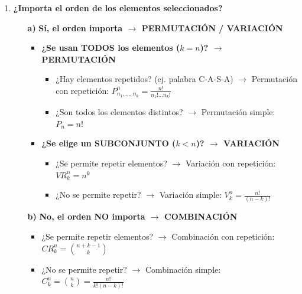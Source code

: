 \documentclass[12pt, letterpaper]{article}
\begin{document}
\begin{enumerate}[label=\bfseries Paso \arabic*:, wide]
    \item \textbf{¿Importa el orden de los elementos seleccionados?}
    \begin{itemize}
        \item[\bfseries a)] \textbf{Sí, el orden importa $\rightarrow$ PERMUTACIÓN / VARIACIÓN}
            \begin{itemize}
                \item \textbf{¿Se usan TODOS los elementos ($k=n$)? $\rightarrow$ PERMUTACIÓN}
                    \begin{itemize}
                        \item ¿Hay elementos repetidos? (ej. palabra C-A-S-A) $\rightarrow$ Permutación con repetición: $P_{n_1, \dots, n_k}^n = \frac{n!}{n_1! \dots n_k!}$
                        \item ¿Son todos los elementos distintos? $\rightarrow$ Permutación simple: $P_n = n!$
                    \end{itemize}
                \item \textbf{¿Se elige un SUBCONJUNTO ($k<n$)? $\rightarrow$ VARIACIÓN}
                    \begin{itemize}
                        \item ¿Se permite repetir elementos? $\rightarrow$ Variación con repetición: $VR_k^n = n^k$
                        \item ¿No se permite repetir? $\rightarrow$ Variación simple: $V_k^n = \frac{n!}{(n-k)!}$
                    \end{itemize}
            \end{itemize}
        \item[\bfseries b)] \textbf{No, el orden NO importa $\rightarrow$ COMBINACIÓN}
            \begin{itemize}
                \item ¿Se permite repetir elementos? $\rightarrow$ Combinación con repetición: $CR_k^n = \binom{n+k-1}{k}$
                \item ¿No se permite repetir? $\rightarrow$ Combinación simple: $C_k^n = \binom{n}{k} = \frac{n!}{k!(n-k)!}$
            \end{itemize}
    \end{itemize}
\end{enumerate}
\end{document}
